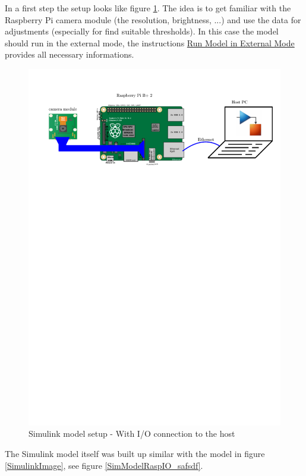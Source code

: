 \documentclass[SensorSystemsProject.tex]{subfiles}
\begin{document}
\medskip
In a first step the setup looks like figure \ref{SetupWithIO}. The idea is to get familiar with the Raspberry Pi camera module (the resolution, brightness, ...) and use the data for adjustments (especially for find suitable thresholds). In this case the model should run in the external mode, the instructions \href{https://de.mathworks.com/help/supportpkg/rtlsdrradio/ug/run-model-in-external-mode.html}{Run Model in External Mode} provides all necessary informations.

\begin{figure}[!h]
\centering
\includegraphics[page=1,width=14cm]{./img/raspberryPi/setups.pdf} 
\caption{Simulink model setup - With I/O connection to the host}
\label{SetupWithIO}
\end{figure}

The Simulink model itself was built up similar with the model in figure \ref{SimulinkImage}, see figure \ref{SimModelRaspIO_safsdf}.
\end{document}
